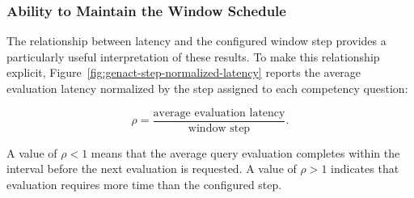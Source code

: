 \subsubsection{Ability to Maintain the Window Schedule}
\label{subsubsec:genact-window-pressure}

The relationship between latency and the configured window step provides a
particularly useful interpretation of these results. To make this relationship
explicit, Figure~\ref{fig:genact-step-normalized-latency} reports the average
evaluation latency normalized by the step assigned to each competency question:

\[
\rho =
\frac{\text{average evaluation latency}}
     {\text{window step}}.
\]

A value of $\rho < 1$ means that the average query evaluation completes within
the interval before the next evaluation is requested. A value of $\rho > 1$
indicates that evaluation requires more time than the configured step.

